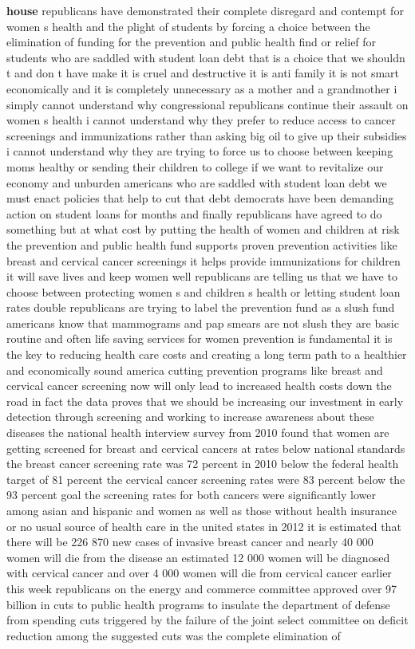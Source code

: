\documentclass{article}
\begin{document}
\vspace{8mm}
{\bf \color{red} house} republicans have demonstrated their complete disregard and contempt for women s health and the plight of students by forcing a choice between the elimination of funding for the prevention and public health find or relief for students who are saddled with student loan debt that is a choice that we shouldn t and don t have make it is cruel and destructive it is anti family it is not smart economically and it is completely unnecessary as a mother and a grandmother i simply cannot understand why congressional republicans continue their assault on women s health i cannot understand why they prefer to reduce access to cancer screenings and immunizations rather than asking big oil to give up their subsidies i cannot understand why they are trying to force us to choose between keeping moms healthy or sending their children to college if we want to revitalize our economy and unburden americans who are saddled with student loan debt we must enact policies that help to cut that debt democrats have been demanding action on student loans for months and finally republicans have agreed to do something but at what cost by putting the health of women and children at risk the prevention and public health fund supports proven prevention activities like breast and cervical cancer screenings it helps provide immunizations for children it will save lives and keep women well republicans are telling us that we have to choose between protecting women s and children s health or letting student loan rates double republicans are trying to label the prevention fund as a slush fund americans know that mammograms and pap smears are not slush they are basic routine and often life saving services for women prevention is fundamental it is the key to reducing health care costs and creating a long term path to a healthier and economically sound america cutting prevention programs like breast and cervical cancer screening now will only lead to increased health costs down the road in fact the data proves that we should be increasing our investment in early detection through screening and working to increase awareness about these diseases the national health interview survey from 2010 found that women are getting screened for breast and cervical cancers at rates below national standards the breast cancer screening rate was 72 percent in 2010 below the federal health target of 81 percent the cervical cancer screening rates were 83 percent below the 93 percent goal the screening rates for both cancers were significantly lower among asian and hispanic and women as well as those without health insurance or no usual source of health care in the united states in 2012 it is estimated that there will be 226 870 new cases of invasive breast cancer and nearly 40 000 women will die from the disease an estimated 12 000 women will be diagnosed with cervical cancer and over 4 000 women will die from cervical cancer earlier this week republicans on the energy and commerce committee approved over 97 billion in cuts to public health programs to insulate the department of defense from spending cuts triggered by the failure of the joint select committee on deficit reduction among the suggested cuts was the complete elimination of 
\end{document}
